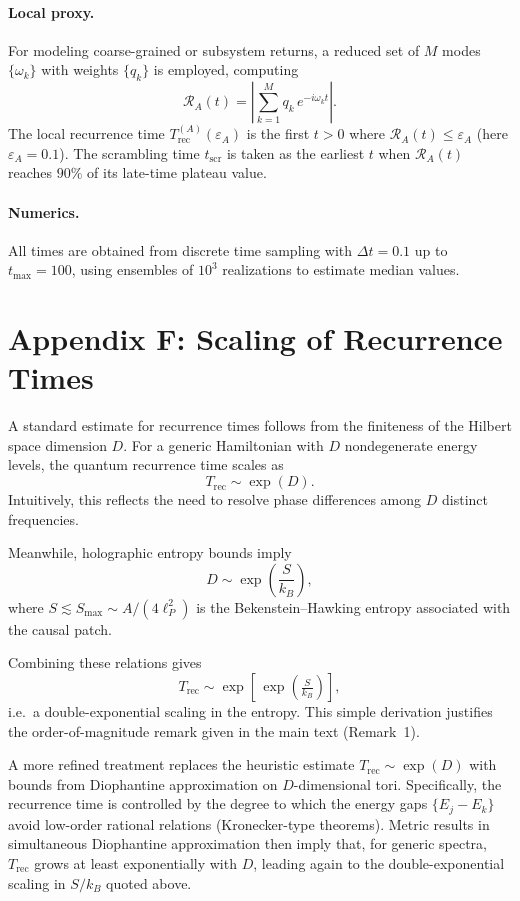 \documentclass[12pt]{article}
\newcommand{\TrecA}{T^{(A)}_{\text{rec}}}
\newcommand{\tscr}{t_{\text{scr}}}
\theoremstyle{remark}
\begin{document}
\paragraph{Local proxy.}
For modeling coarse-grained or subsystem returns, a reduced set of $M$ modes $\{\omega_k\}$ with weights $\{q_k\}$ is employed, computing
\[
\mathcal{R}_A(t) = \left| \sum_{k=1}^M q_k \, e^{-i \omega_k t} \right| .
\]
The local recurrence time $\TrecA(\varepsilon_A)$ is the first $t>0$ where $\mathcal{R}_A(t) \leq \varepsilon_A$ (here $\varepsilon_A = 0.1$).
The scrambling time $\tscr$ is taken as the earliest $t$ when $\mathcal{R}_A(t)$ reaches $90\%$ of its late-time plateau value.

\paragraph{Numerics.}
All times are obtained from discrete time sampling with $\Delta t = 0.1$ up to $t_{\max} = 100$, 
using ensembles of $10^3$ realizations to estimate median values.

\clearpage
\section*{Appendix F: Scaling of Recurrence Times}

A standard estimate for recurrence times follows from the finiteness of the Hilbert space 
dimension $D$. For a generic Hamiltonian with $D$ nondegenerate energy levels, the 
quantum recurrence time scales as 
\begin{equation}
   T_{\mathrm{rec}} \sim \exp(D).
\end{equation}
Intuitively, this reflects the need to resolve phase differences among $D$ distinct 
frequencies. 

Meanwhile, holographic entropy bounds imply 
\begin{equation}
   D \sim \exp\!\left(\frac{S}{k_B}\right),
\end{equation}
where $S \lesssim S_{\max} \sim A/(4 \ell_P^2)$ is the Bekenstein--Hawking entropy 
associated with the causal patch. 

Combining these relations gives
\begin{equation}
   T_{\mathrm{rec}} \sim \exp\!\left[\,\exp\!\left(\tfrac{S}{k_B}\right)\right],
\end{equation}
i.e.\ a double-exponential scaling in the entropy. This simple derivation justifies the 
order-of-magnitude remark given in the main text (Remark~1).

A more refined treatment replaces the heuristic estimate $T_{\mathrm{rec}} \sim \exp(D)$ 
with bounds from Diophantine approximation on $D$-dimensional tori. 
Specifically, the recurrence time is controlled by the degree to which the energy 
gaps $\{E_j - E_k\}$ avoid low-order rational relations (Kronecker-type theorems). 
Metric results in simultaneous Diophantine approximation then imply that, 
for generic spectra, $T_{\mathrm{rec}}$ grows at least exponentially with $D$, 
leading again to the double-exponential scaling in $S/k_B$ quoted above.
\end{document}
